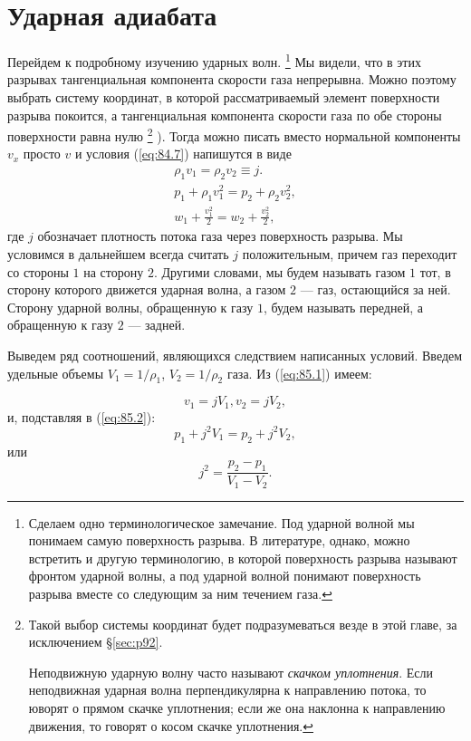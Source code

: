 \section{Ударная адиабата}
\label{sec:p85}


Перейдем к подробному изучению ударных волн.
\footnote{Сделаем одно терминологическое замечание. Под ударной волной мы понимаем самую поверхность разрыва. В литературе, однако, можно встретить и другую терминологию, в которой поверхность разрыва называют фронтом ударной волны, а под ударной волной понимают поверхность разрыва вместе со следующим за ним течением газа.}
Мы видели, что в этих разрывах тангенциальная компонента скорости газа непрерывна.
Можно поэтому выбрать систему координат, в которой рассматриваемый элемент поверхности разрыва покоится, а тангенциальная компонента скорости газа по обе стороны поверхности равна нулю
\footnote{Такой выбор системы координат будет подразумеваться везде в этой главе, за исключением \S \ref{sec:p92}.

Неподвижную ударную волну часто называют \emph{скачком уплотнения}.
Если неподвижная ударная волна перпендикулярна к направлению потока, то
юворят о прямом скачке уплотнения; если же она наклонна к направлению
движения, то говорят о косом скачке уплотнения.}
).
Тогда можно писать вместо нормальной компоненты $v_x$ просто $v$ и условия (\ref{eq:84.7}) напишутся в виде
\begin{eqnarray}
    \label{eq:85.1}
    \rho_1 v_1 = \rho_2 v_2 \equiv j.\\
    \label{eq:85.2}
    p_1 + \rho_1 v_1^2=p_2 + \rho_2 v_2^2, \\
    \label{eq:85.3}
    w_1 + \frac{v_1^2}{2}=w_2 + \frac{v_2^2}{2},
\end{eqnarray}
где $j$ обозначает плотность потока газа через поверхность разрыва.
Мы условимся в дальнейшем всегда считать $j$ положительным, причем газ переходит
со стороны $1$ на сторону $2$.
Другими словами, мы будем называть газом $1$ тот, в сторону которого движется
ударная волна, а газом $2$ --- газ, остающийся за ней.
Сторону ударной волны, обращенную к газу $1$, будем называть передней, а
обращенную к газу $2$ --- задней.

Выведем ряд соотношений, являющихся следствием написанных условий. Введем удельные объемы
$V_1=1/\rho_1$, $V_2=1/\rho_2$ газа. Из (\ref{eq:85.1}) имеем:

\begin{equation}
    \label{eq:85.4}
    v_1 = j V_1, v_2 = j V_2,
\end{equation}
и, подставляя в (\ref{eq:85.2}):
\begin{equation}
    \label{eq:85.5}
    p_1 + j^2 V_1 = p_2 + j^2 V_2,
\end{equation}
или
\begin{equation}
    \label{eq:85.6}
    {j}^{2}=\frac{p_2-p_1}{V_1-V_2}.
\end{equation}


